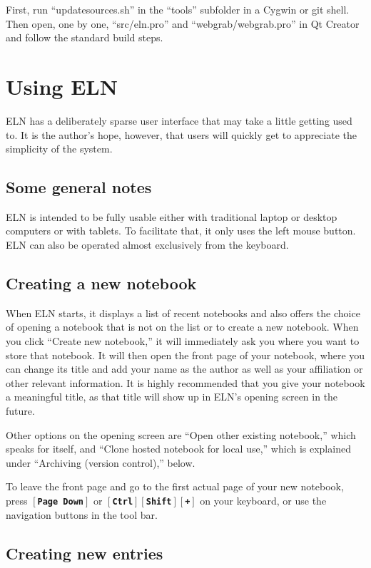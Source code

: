 \documentclass[11pt]{report}
\def\keystroke#1{$\left[\right.\!${\tt\bfseries #1}$\!\left.\right]$}
\def\key#1{\keystroke{#1}}
\def\controlshift#1{\keystroke{Ctrl}\keystroke{Shift}\keystroke{#1}}
\begin{document}
First, run ``updatesources.sh'' in the
``tools'' subfolder in a Cygwin or git shell. Then open, one by one, ``src/eln.pro''
and ``webgrab/webgrab.pro'' in Qt
Creator and follow the standard build steps.

\chapter{Using ELN}

ELN has a deliberately sparse user interface that may take a little
getting used to. It is the author's hope, however, that users will
quickly get to appreciate the simplicity of the system.

\section{Some general notes}

ELN is intended to be fully usable either with traditional laptop or
desktop computers or with tablets. To facilitate that, it only uses
the left mouse button. ELN can also be operated almost exclusively from the
keyboard.

\section{Creating a new notebook}

When ELN starts, it displays a list of recent notebooks and also offers the
choice of opening a notebook that is not on the list or to create a
new notebook. When you click ``Create new notebook,'' it will
immediately ask you where you want to store that notebook. It will
then open the front page of your notebook, where you can change its
title and add your name as the author as well as your affiliation or
other relevant information. It is highly recommended that you give
your notebook a meaningful title, as that title will show up in ELN's
opening screen in the future.

Other options on the opening screen are ``Open other existing
notebook,'' which speaks for itself, and ``Clone hosted notebook for
local use,'' which is explained under ``Archiving (version control),''
below.

To leave the front page and go to the first actual page of your new
notebook, press \key{Page Down} or \controlshift{+} on your keyboard,
or use the navigation buttons in the tool bar.

\section{Creating new entries}
\end{document}
